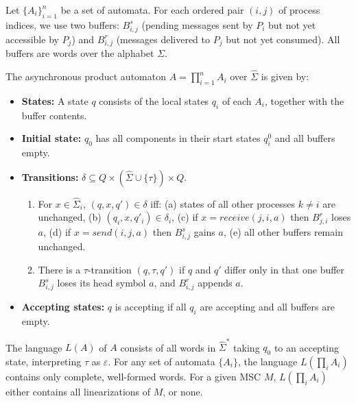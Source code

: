 \begin{definition}
Let $\{A_i\}_{i=1}^n$ be a set of automata. For each ordered pair 
$(i,j)$ of process indices, we use two buffers: $B^s_{i,j}$ 
(pending messages sent by $P_i$ but not yet accessible by $P_j$) 
and $B^r_{i,j}$ (messages delivered to $P_j$ but not yet consumed). 
All buffers are words over the alphabet $\Sigma$.

The asynchronous product automaton 
$A = \prod_{i=1}^n A_i$ over $\hat{\Sigma}$ is given by:

\begin{itemize}
  \item \textbf{States:} A state $q$ consists of the local states 
  $q_i$ of each $A_i$, together with the buffer contents.
  \item \textbf{Initial state:} $q_0$ has all components in their 
  start states $q_i^0$ and all buffers empty.
  \item \textbf{Transitions:} $\delta \subseteq Q \times 
  (\hat{\Sigma} \cup \{\tau\}) \times Q$.
    \begin{enumerate}
      \item For $x \in \hat{\Sigma}_i$, $(q,x,q') \in \delta$ iff:  
      (a) states of all other processes $k \neq i$ are unchanged,  
      (b) $(q_i,x,q'_i) \in \delta_i$,  
      (c) if $x = receive(j,i,a)$ then $B^r_{j,i}$ loses $a$,  
      (d) if $x = send(i,j,a)$ then $B^s_{i,j}$ gains $a$,  
      (e) all other buffers remain unchanged.
      \item There is a $\tau$-transition $(q,\tau,q')$ if $q$ and 
      $q'$ differ only in that one buffer $B^s_{i,j}$ loses its 
      head symbol $a$, and $B^r_{i,j}$ appends $a$.
    \end{enumerate}
  \item \textbf{Accepting states:} $q$ is accepting if all $q_i$ 
  are accepting and all buffers are empty.
\end{itemize}

The language $L(A)$ of $A$ consists of all words in $\hat{\Sigma}^*$ 
taking $q_0$ to an accepting state, interpreting $\tau$ as 
$\varepsilon$. For any set of automata $\{A_i\}$, the language 
$L(\prod_i A_i)$ contains only complete, well-formed words. For a 
given MSC $M$, $L(\prod_i A_i)$ either contains all linearizations 
of $M$, or none.
\end{definition}


